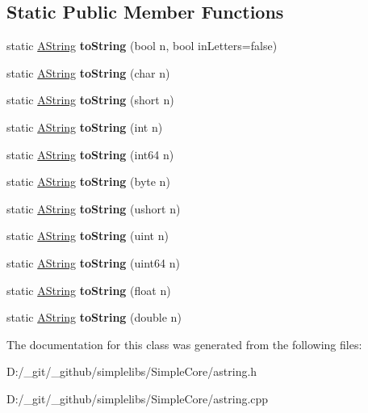 \subsection*{Static Public Member Functions}
\begin{DoxyCompactItemize}
\item 
\mbox{\label{class_a_string_a13ac330330d3f576a06e8ef3316ef293}} 
static \mbox{\hyperlink{class_a_string}{A\+String}} {\bfseries to\+String} (bool n, bool in\+Letters=false)
\item 
\mbox{\label{class_a_string_a364c9570a8fc099dd09ce78ae8818dc7}} 
static \mbox{\hyperlink{class_a_string}{A\+String}} {\bfseries to\+String} (char n)
\item 
\mbox{\label{class_a_string_a82429501ef9ff6b7c629ad60413d1c3e}} 
static \mbox{\hyperlink{class_a_string}{A\+String}} {\bfseries to\+String} (short n)
\item 
\mbox{\label{class_a_string_a90c07f40ff8685c41a3c6db271754686}} 
static \mbox{\hyperlink{class_a_string}{A\+String}} {\bfseries to\+String} (int n)
\item 
\mbox{\label{class_a_string_a47d640a0d7b63e9253f57568d2ff2542}} 
static \mbox{\hyperlink{class_a_string}{A\+String}} {\bfseries to\+String} (int64 n)
\item 
\mbox{\label{class_a_string_ae64483053e51e9e0041763ec5eb21ba5}} 
static \mbox{\hyperlink{class_a_string}{A\+String}} {\bfseries to\+String} (byte n)
\item 
\mbox{\label{class_a_string_abafe383896be322a46407bd02c41b897}} 
static \mbox{\hyperlink{class_a_string}{A\+String}} {\bfseries to\+String} (ushort n)
\item 
\mbox{\label{class_a_string_adb67a341fe4bd0661b0a5f141080d633}} 
static \mbox{\hyperlink{class_a_string}{A\+String}} {\bfseries to\+String} (uint n)
\item 
\mbox{\label{class_a_string_a88cbae5cb369bb16f664922dfd94b8e4}} 
static \mbox{\hyperlink{class_a_string}{A\+String}} {\bfseries to\+String} (uint64 n)
\item 
\mbox{\label{class_a_string_a90e2279607dbe3d80f96da3b85b5fde9}} 
static \mbox{\hyperlink{class_a_string}{A\+String}} {\bfseries to\+String} (float n)
\item 
\mbox{\label{class_a_string_a8f368aefb4edd72523a764d960ba7308}} 
static \mbox{\hyperlink{class_a_string}{A\+String}} {\bfseries to\+String} (double n)
\end{DoxyCompactItemize}


The documentation for this class was generated from the following files\+:\begin{DoxyCompactItemize}
\item 
D\+:/\+\_\+git/\+\_\+github/simplelibs/\+Simple\+Core/astring.\+h\item 
D\+:/\+\_\+git/\+\_\+github/simplelibs/\+Simple\+Core/astring.\+cpp\end{DoxyCompactItemize}
